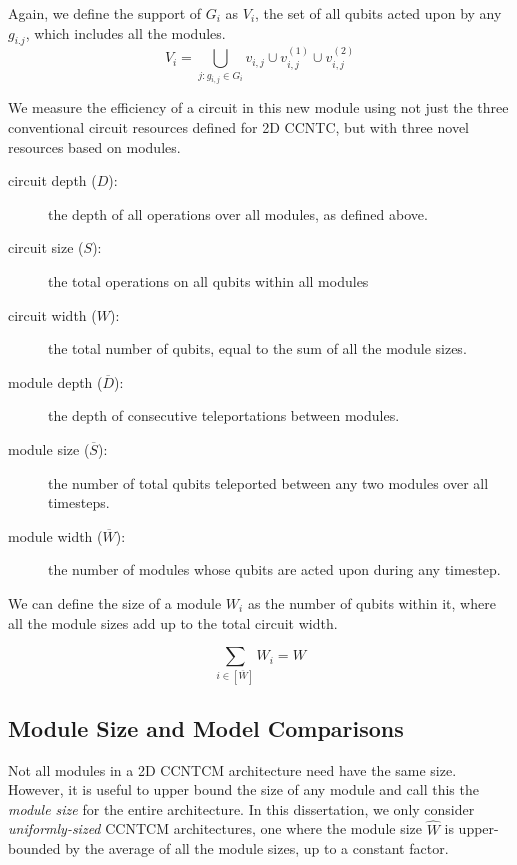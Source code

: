 \begin{definition}
\begin{itemize}
Again, we define the support of $G_i$
as $V_i$, the set of all qubits acted upon by any $g_{i.j}$, which
includes all the modules.
\begin{equation}
V_i = \bigcup_{j: g_{i,j} \in G_i} v_{i,j} \cup v^{(1)}_{i,j} \cup v^{(2)}_{i,j} 
\end{equation}

\end{itemize}
\end{definition}

We measure the efficiency of a circuit in this new module using not just
the three conventional circuit resources defined for \textsf{2D CCNTC}, but with three novel resources
based on modules.

\begin{description}

\item[circuit depth ($D$):] the depth of all operations over all modules,
as defined above.
\item[circuit size ($S$):] the total operations on all qubits within all
modules
\item[circuit width ($W$):] the total number of qubits, equal to the sum of all the module sizes.
\item[module depth ($\overline{D}$):] the depth of consecutive teleportations between modules.
\item[module size ($\overline{S}$):] the number of total qubits teleported between any two modules over all timesteps.
\item[module width ($\overline{W}$):] the number of modules whose qubits are
acted upon during any timestep.

\end{description}

We can define the size of a module $W_i$ as the number of qubits within it,
where all the module sizes add up to the total circuit width.

\begin{equation}
\sum_{i \in [\overline{W}]} W_i = W
\end{equation}

\subsection{Module Size and Model Comparisons}
\label{subsec:module-compare}

Not all modules in a \textsf{2D CCNTCM} architecture need have the same
size. However, it is useful to upper bound the size of any module and call
this the \emph{module size} for the entire architecture. In this 
dissertation, we only consider \emph{uniformly-sized} \textsf{CCNTCM} architectures, one where
the module size $\hat{W}$
is upper-bounded by the average of all the module sizes, up to a constant
factor.

